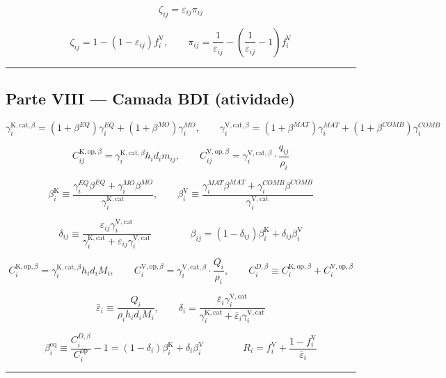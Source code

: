 \documentclass[
  10pt,
]{article}
\begin{document}
\[\boxed{\zeta_{ij}=\varepsilon_{ij}\pi_{ij}}\]

\[\zeta_{ij}=1-(1-\varepsilon_{ij})f_i^{\mathrm V}, \qquad \pi_{ij}=\frac{1}{\varepsilon_{ij}}-\left(\frac{1}{\varepsilon_{ij}}-1\right)f_i^{\mathrm V}\]

\begin{center}\rule{0.5\linewidth}{0.5pt}\end{center}

\hypertarget{parte-viii-camada-bdi-atividade}{%
\subsection{Parte VIII --- Camada BDI
(atividade)}\label{parte-viii-camada-bdi-atividade}}

\[\gamma_i^{\mathrm{K,cat},\beta}=(1+\beta^{EQ})\gamma_i^{EQ}+(1+\beta^{MO})\gamma_i^{MO}, \qquad \gamma_i^{\mathrm{V,cat},\beta}=(1+\beta^{MAT})\gamma_i^{MAT}+(1+\beta^{COMB})\gamma_i^{COMB}\]

\[C_{ij}^{\mathrm{K,op},\beta}=\gamma_i^{\mathrm{K,cat},\beta}h_id_im_{ij}, \qquad C_{ij}^{\mathrm{V,op},\beta}=\gamma_i^{\mathrm{V,cat},\beta}\cdot\frac{q_{ij}}{\rho_i}\]

\[\beta_i^{\mathrm K}\equiv\frac{\gamma_i^{EQ}\beta^{EQ}+\gamma_i^{MO}\beta^{MO}}{\gamma_i^{\mathrm{K,cat}}}, \qquad \beta_i^{\mathrm V}\equiv\frac{\gamma_i^{MAT}\beta^{MAT}+\gamma_i^{COMB}\beta^{COMB}}{\gamma_i^{\mathrm{V,cat}}}\]

\[\delta_{ij}\equiv\frac{\varepsilon_{ij}\gamma_i^{\mathrm{V,cat}}}{\gamma_i^{\mathrm{K,cat}}+\varepsilon_{ij}\gamma_i^{\mathrm{V,cat}}} \qquad\qquad \boxed{\beta_{ij}=(1-\delta_{ij})\beta_i^{\mathrm K}+\delta_{ij}\beta_i^{\mathrm V}}\]

\[C_i^{\mathrm{K,op},\beta}=\gamma_i^{\mathrm{K,cat},\beta}h_id_iM_i, \qquad C_i^{\mathrm{V,op},\beta}=\gamma_i^{\mathrm{V,cat},\beta}\cdot\frac{Q_i}{\rho_i}, \qquad C_i^{D,\beta}\equiv C_i^{\mathrm{K,op},\beta}+C_i^{\mathrm{V,op},\beta}\]

\[\bar\varepsilon_i\equiv\frac{Q_i}{\rho_ih_id_iM_i}, \qquad \delta_i=\frac{\bar\varepsilon_i\gamma_i^{\mathrm{V,cat}}}{\gamma_i^{\mathrm{K,cat}}+\bar\varepsilon_i\gamma_i^{\mathrm{V,cat}}}\]

\[\boxed{\beta_i^{\mathrm{eq}}\equiv\frac{C_i^{D,\beta}}{C_i^{\mathrm{op}}}-1=(1-\delta_i)\beta_i^{\mathrm K}+\delta_i\beta_i^{\mathrm V}} \qquad\qquad \boxed{R_i = f_i^{\mathrm V} + \frac{1-f_i^{\mathrm V}}{\bar\varepsilon_i}}\]

\begin{center}\rule{0.5\linewidth}{0.5pt}\end{center}
\end{document}

